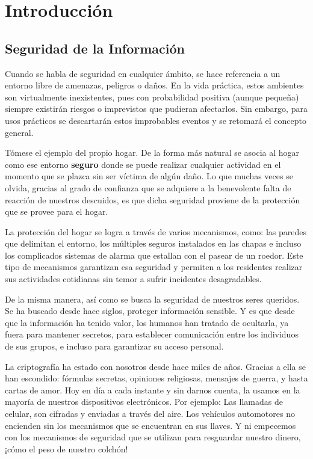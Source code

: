 \chapter{Introducción}
\section{Seguridad de la Información}
Cuando se habla de seguridad en cualquier ámbito, se hace referencia a un entorno libre de amenazas, peligros o daños. En la vida práctica, estos ambientes son virtualmente inexistentes, pues con probabilidad positiva (aunque pequeña) siempre existirán riesgos o imprevistos que pudieran afectarlos. Sin embargo, para usos prácticos se descartarán estos improbables eventos y se retomará el concepto general.

Tómese el ejemplo del propio hogar. De la forma más natural se asocia al hogar como ese entorno {\bf seguro} donde se puede realizar cualquier actividad en el momento que se plazca sin ser víctima de algún daño.
Lo que muchas veces se olvida, gracias al grado de confianza que se adquiere a la benevolente falta de reacción de nuestros descuidos, es que dicha seguridad proviene de la protección que se provee para el hogar.

 La protección del hogar se logra a través de varios mecanismos, como: las paredes que delimitan el entorno, los múltiples seguros instalados en las chapas e incluso los complicados sistemas de alarma que estallan con el pasear de un roedor. Este tipo de mecanismos garantizan esa seguridad y permiten a los residentes realizar sus actividades cotidianas sin temor a sufrir incidentes desagradables.

De la misma manera, así como se busca la seguridad de nuestros seres queridos. Se ha buscado desde hace siglos, proteger información sensible.  Y es que desde que la información ha tenido valor, los humanos han tratado de ocultarla, ya fuera para mantener secretos, para establecer comunicación entre los individuos de sus grupos, e incluso para garantizar su acceso personal.

La criptografía ha estado con nosotros desde hace miles de años. Gracias a ella se han escondido: fórmulas secretas, opiniones religiosas, mensajes de guerra, y hasta  cartas de amor. Hoy en día a cada instante y sin darnos cuenta, la usamos en la mayoría de nuestros dispositivos electrónicos. Por ejemplo: Las llamadas de celular, son cifradas y enviadas a través del aire. Los vehículos automotores no encienden sin los mecanismos que se encuentran en sus llaves. Y ni empecemos con los mecanismos de seguridad que se utilizan para resguardar nuestro dinero, ¡cómo el peso de nuestro colchón!

